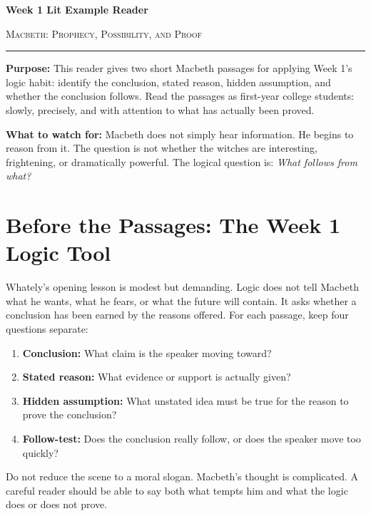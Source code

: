 \documentclass[12pt]{article}
\begin{document}
\begin{center}
{\LARGE\bfseries Week 1 Lit Example Reader}\par\vspace{0.05em}
{\large\scshape Macbeth: Prophecy, Possibility, and Proof}\par\vspace{0.15em}
\rule{0.78\textwidth}{0.5pt}
\end{center}

\textbf{Purpose:} This reader gives two short Macbeth passages for applying Week 1's logic habit: identify the conclusion, stated reason, hidden assumption, and whether the conclusion follows. Read the passages as first-year college students: slowly, precisely, and with attention to what has actually been proved.

\textbf{What to watch for:} Macbeth does not simply hear information. He begins to reason from it. The question is not whether the witches are interesting, frightening, or dramatically powerful. The logical question is: \textit{What follows from what?}

\section*{Before the Passages: The Week 1 Logic Tool}

Whately's opening lesson is modest but demanding. Logic does not tell Macbeth what he wants, what he fears, or what the future will contain. It asks whether a conclusion has been earned by the reasons offered. For each passage, keep four questions separate:

\begin{enumerate}[leftmargin=1.5em,itemsep=0.2em]
\item \textbf{Conclusion:} What claim is the speaker moving toward?
\item \textbf{Stated reason:} What evidence or support is actually given?
\item \textbf{Hidden assumption:} What unstated idea must be true for the reason to prove the conclusion?
\item \textbf{Follow-test:} Does the conclusion really follow, or does the speaker move too quickly?
\end{enumerate}

Do not reduce the scene to a moral slogan. Macbeth's thought is complicated. A careful reader should be able to say both what tempts him and what the logic does or does not prove.
\end{document}
